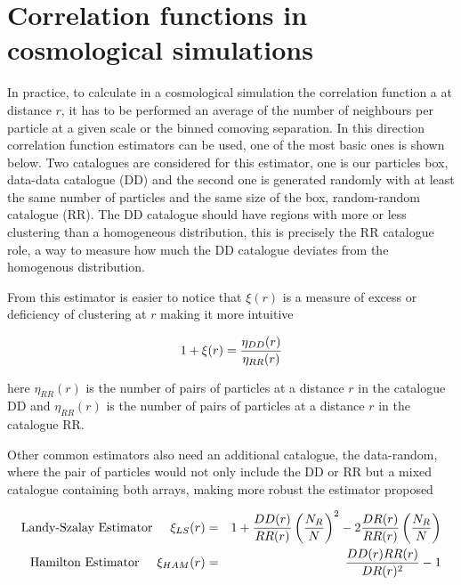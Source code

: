 \section{ Correlation functions in cosmological simulations }


In practice, to calculate in a cosmological simulation the correlation function 
a at distance $r$, it has to be performed an average of the number of neighbours per 
particle at a given scale or the binned comoving separation. In this direction 
correlation function estimators can be used, one of the most basic ones is shown below. 
Two catalogues are considered for this estimator, one is our particles box, 
data-data catalogue (DD) and the second one is generated 
randomly with at least the same number of particles and the same size of the box, 
random-random catalogue (RR). The DD catalogue should have regions with more or
less clustering than a homogeneous distribution, this is precisely the RR catalogue role, 
a way to measure how much the DD catalogue deviates from the homogenous distribution. 

From this estimator is easier to notice that $\xi(r)$ is a measure of 
excess or deficiency of clustering at $r$ making it more intuitive 

\[1+\xi(r)= \frac{\eta_{DD}(r)}{\eta_{RR}(r)}\]

here $\eta_{RR}(r)$ is the number of pairs of particles at a distance $r$ in the catalogue DD 
and $\eta_{RR}(r)$ is the number of pairs of particles at a distance $r$ in the catalogue RR. 

Other common estimators also need an additional catalogue, the data-random, where the
pair of particles would not only include the DD or RR but a mixed catalogue containing 
both arrays, making more robust the estimator proposed \cite{Est_CF}

\begin{eqnarray}
\mbox{Landy-Szalay Estimator}\hspace{0.5cm} \xi_{LS}(r)&=& 1+\frac{DD(r)}{RR(r)}\left(\frac{N_R}{N}\right)^2-2\frac{DR(r)}{RR(r)}\left(\frac{N_R}{N}\right) \nonumber \\
\mbox{Hamilton Estimator}  \hspace{0.5cm} \xi_{HAM}(r)&=&\frac{DD(r)RR(r)}{DR(r)^2}-1 \nonumber 
\end{eqnarray}

